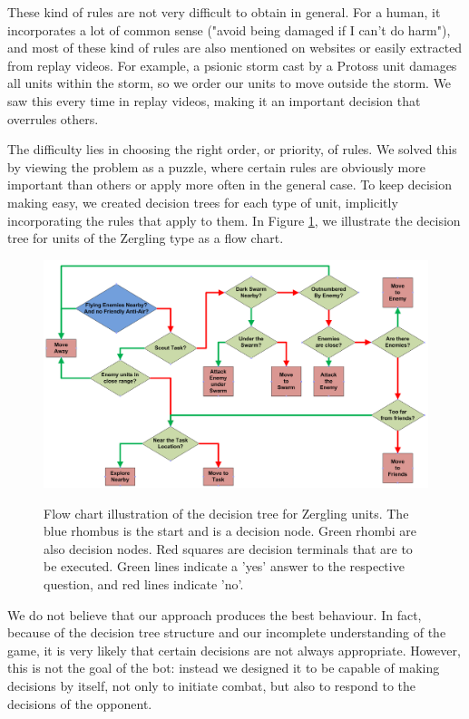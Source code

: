 These kind of rules are not very difficult to obtain in general. For a human, it incorporates a lot of common sense ("avoid being damaged if I can't do harm"), and most of these kind of rules are also mentioned on websites or easily extracted from replay videos. For example, a psionic storm cast by a Protoss unit damages all units within the storm, so we order our units to move outside the storm. We saw this every time in replay videos, making it an important decision that overrules others. 

The difficulty lies in choosing the right order, or priority, of rules. We solved this by viewing the problem as a puzzle, where certain rules are obviously more important than others or apply more often in the general case. To keep decision making easy, we created decision trees for each type of unit, implicitly incorporating the rules that apply to them. In Figure \ref{fig:micro}, we illustrate the decision tree for units of the Zergling type as a flow chart.

\begin{figure}
\centering
\includegraphics[scale=0.35]{starcraft_zerg_diagram_groot}
\label{fig:micro}
\caption{Flow chart illustration of the decision tree for Zergling units. The blue rhombus is the start and is a decision node. Green rhombi are also decision nodes. Red squares are decision terminals that are to be executed. Green lines indicate a 'yes' answer to the respective question, and red lines indicate 'no'.}
\end{figure}

We do not believe that our approach produces the best behaviour. In fact, because of the decision tree structure and our incomplete understanding of the game, it is very likely that certain decisions are not always appropriate. However, this is not the goal of the bot: instead we designed it to be capable of making decisions by itself, not only to initiate combat, but also to respond to the decisions of the opponent.


